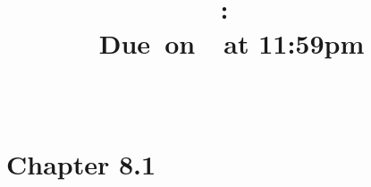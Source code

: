 \documentclass{article}
\title{
	\vspace{2in}
	\textmd{\textbf{\hmwkClass:\ \hmwkTitle}}\\
	\normalsize\vspace{0.1in}\small{Due\ on\ \hmwkDueDate\ at 11:59pm}\\
	\vspace{0.1in}\large{\textit{\hmwkClassInstructor\ \hmwkClassTime}}
	\vspace{3in}
}
\author{\hmwkAuthorName}
\date{}
\begin{document}
	\maketitle
	
	\pagebreak
	
	
	\section{Chapter 8.1}
	
	
\end{document}

